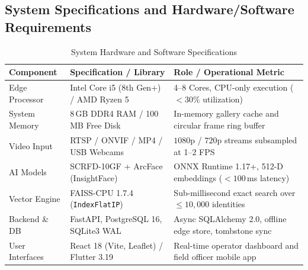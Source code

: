 \documentclass[10pt, a4paper]{article}
\begin{document}
\subsection{System Specifications and Hardware/Software Requirements}
\begin{table}[h!]
\centering
\small
\renewcommand{\arraystretch}{1.1}
\caption{System Hardware and Software Specifications}
\label{tab:specs}
\begin{tabularx}{\textwidth}{@{}l p{4.2cm} X@{}}
\toprule
\textbf{Component} & \textbf{Specification / Library} & \textbf{Role / Operational Metric} \\
\midrule
Edge Processor & Intel Core i5 (8th Gen+) / AMD Ryzen 5 & 4--8 Cores, CPU-only execution ($<30\%$ utilization) \\
System Memory & 8\,GB DDR4 RAM / 100\,MB Free Disk & In-memory gallery cache and circular frame ring buffer \\
Video Input & RTSP / ONVIF / MP4 / USB Webcams & $1080$p / $720$p streams subsampled at 1--2 FPS \\
AI Models & SCRFD-10GF + ArcFace (InsightFace) & ONNX Runtime 1.17+, 512-D embeddings ($<100$\,ms latency) \\
Vector Engine & FAISS-CPU 1.7.4 (\texttt{IndexFlatIP}) & Sub-millisecond exact search over $\le 10{,}000$ identities \\
Backend \& DB & FastAPI, PostgreSQL 16, SQLite3 WAL & Async SQLAlchemy 2.0, offline edge store, tombstone sync \\
User Interfaces & React 18 (Vite, Leaflet) / Flutter 3.19 & Real-time operator dashboard and field officer mobile app \\
\bottomrule
\end{tabularx}
\end{table}

\newpage
\end{document}

